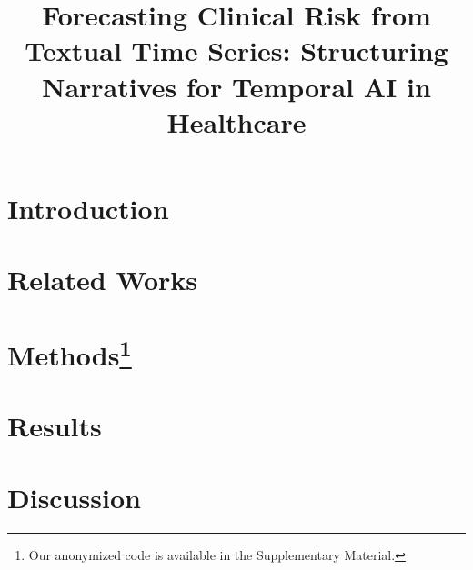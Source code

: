 \documentclass[letterpaper]{article} %
\title{Forecasting Clinical Risk from Textual Time Series: Structuring Narratives for Temporal AI in Healthcare}
\begin{document}
\maketitle

\begin{abstract}

\end{abstract}

\section{Introduction}
\label{sec:intro}


\section{Related Works}
\label{sec:related_works}


\section{Methods\footnote{Our anonymized code is available in the Supplementary Material.}
}
\label{sec:methods}




\section{Results}
\label{sec:results}


\section{Discussion}
\label{sec:discussion}







\clearpage



\clearpage

\appendix

\end{document}
